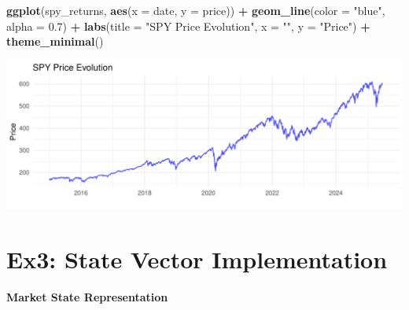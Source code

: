 \documentclass[
]{article}
\newenvironment{Shaded}{\begin{snugshade}}{\end{snugshade}}
\newcommand{\AttributeTok}[1]{\textcolor[rgb]{0.13,0.29,0.53}{#1}}
\newcommand{\FloatTok}[1]{\textcolor[rgb]{0.00,0.00,0.81}{#1}}
\newcommand{\FunctionTok}[1]{\textcolor[rgb]{0.13,0.29,0.53}{\textbf{#1}}}
\newcommand{\NormalTok}[1]{#1}
\newcommand{\SpecialCharTok}[1]{\textcolor[rgb]{0.81,0.36,0.00}{\textbf{#1}}}
\newcommand{\StringTok}[1]{\textcolor[rgb]{0.31,0.60,0.02}{#1}}
\begin{document}
\begin{Shaded}
\begin{Highlighting}[]
\FunctionTok{ggplot}\NormalTok{(spy\_returns, }\FunctionTok{aes}\NormalTok{(}\AttributeTok{x =}\NormalTok{ date, }\AttributeTok{y =}\NormalTok{ price)) }\SpecialCharTok{+} \FunctionTok{geom\_line}\NormalTok{(}\AttributeTok{color =} \StringTok{"blue"}\NormalTok{, }\AttributeTok{alpha =} \FloatTok{0.7}\NormalTok{) }\SpecialCharTok{+} 
  \FunctionTok{labs}\NormalTok{(}\AttributeTok{title =} \StringTok{"SPY Price Evolution"}\NormalTok{, }\AttributeTok{x =} \StringTok{""}\NormalTok{, }\AttributeTok{y =} \StringTok{"Price"}\NormalTok{) }\SpecialCharTok{+} \FunctionTok{theme\_minimal}\NormalTok{()}
\end{Highlighting}
\end{Shaded}

\includegraphics{GroupDTask1_files/figure-latex/data-viz-1.pdf}

\hypertarget{ex3-state-vector-implementation}{%
\section{Ex3: State Vector
Implementation}\label{ex3-state-vector-implementation}}

\textbf{Market State Representation}
\end{document}
